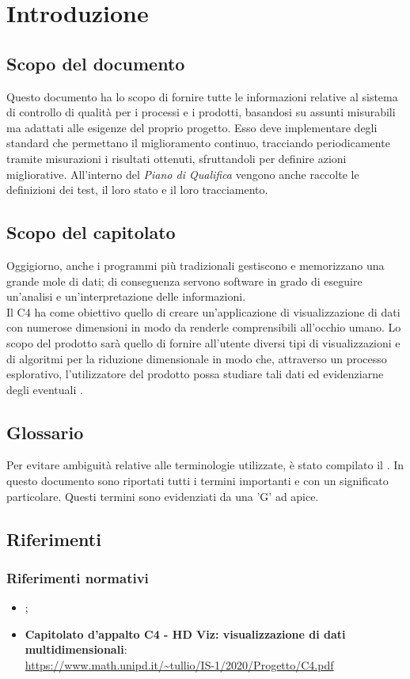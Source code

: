 \section{Introduzione}
\subsection{Scopo del documento}
Questo documento ha lo scopo di fornire tutte le informazioni relative al sistema di controllo di qualità per i processi e i prodotti, basandosi su assunti misurabili ma adattati alle esigenze del proprio progetto.
Esso deve implementare degli standard che permettano il miglioramento continuo, tracciando periodicamente tramite misurazioni i risultati ottenuti, sfruttandoli per definire azioni migliorative. All'interno del \textit{Piano di Qualifica} vengono anche raccolte le definizioni dei test, il loro stato e il loro tracciamento. 

\subsection{Scopo del capitolato}
Oggigiorno, anche i programmi più tradizionali gestiscono e memorizzano una grande mole di dati; di conseguenza servono software in grado di eseguire un'analisi e un'interpretazione delle informazioni.\\
Il  C4 ha come obiettivo quello di creare un'applicazione di visualizzazione di dati con numerose dimensioni in modo da renderle comprensibili all'occhio umano.  Lo scopo del prodotto sarà quello di fornire all'utente diversi tipi di visualizzazioni e di algoritmi per la riduzione dimensionale in modo che, attraverso un processo esplorativo, l'utilizzatore del prodotto possa studiare tali dati ed evidenziarne degli eventuali . 

\subsection{Glossario}
Per evitare ambiguità relative alle terminologie utilizzate, è stato compilato il . In questo documento sono riportati tutti i termini importanti e con un significato particolare. Questi termini sono evidenziati da una 'G' ad apice.

\subsection{Riferimenti}
\subsubsection{Riferimenti normativi}
\begin{itemize}	
\item \textbf{};
	
\item \textbf{Capitolato d'appalto C4 - HD Viz: visualizzazione di dati multidimensionali}:\\
	\textcolor{blue}{\url{https://www.math.unipd.it/~tullio/IS-1/2020/Progetto/C4.pdf}}

\end{itemize}

